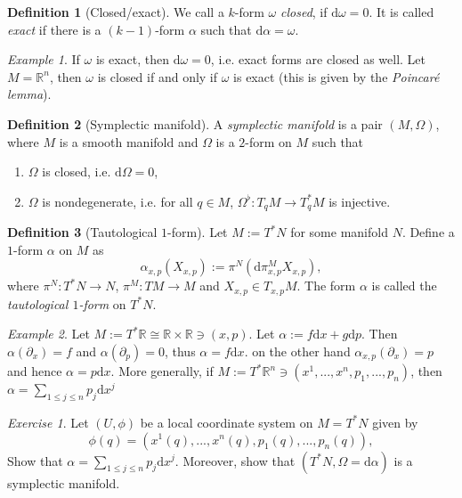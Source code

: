 \documentclass[11pt]{amsart}
\numberwithin{equation}{section}
\theoremstyle{plain}
\theoremstyle{definition}
\newtheorem{defn}{Definition}[subsection]
\theoremstyle{remark}
\newtheorem{exe}{Exercise}[subsection]
\newtheorem{ex}{Example}[subsection]
\newcommand{\R}{\mathbb{R}}
\newcommand{\dd}{{\mathrm{d}}}
\begin{document}
\begin{defn}[Closed/exact]
We call a $k$-form $\omega$ \emph{closed}, if $\dd\omega=0$. It is called \emph{exact} if there is a $(k-1)$-form $\alpha$ such that $\dd\alpha=\omega$.
\end{defn}

\begin{ex}
If $\omega$ is exact, then $\dd\omega=0$, i.e. exact forms are closed as well. Let $M=\R^n$, then $\omega$ is closed if and only if $\omega$ is exact (this is given by the \emph{Poincar\'e lemma}).
\end{ex}


\begin{defn}[Symplectic manifold]
A \emph{symplectic manifold} is a pair $(M,\Omega)$, where $M$ is a smooth manifold and $\Omega$ is a $2$-form on $M$ such that
\begin{enumerate}
\item{$\Omega$ is closed, i.e. $\dd\Omega=0$,}
\item{$\Omega$ is nondegenerate, i.e. for all $q\in M$, $\Omega^\flat\colon T_qM\to T_q^*M$ is injective.}
\end{enumerate}
\end{defn}

\begin{defn}[Tautological $1$-form]
Let $M:=T^*N$ for some manifold $N$. Define a $1$-form $\alpha$ on $M$ as 
$$\alpha_{x,p}(X_{x,p}):=\pi^N(\dd \pi^M_{x,p}X_{x,p}),$$
where $\pi^N\colon T^*N\to N$, $\pi^M\colon TM\to M$ and $X_{x,p}\in T_{x,p}M$. The form $\alpha$ is called the \emph{tautological $1$-form} on $T^*N$.
\end{defn}

\begin{ex}
Let $M:=T^*\R\cong \R\times \R\ni(x,p)$. Let $\alpha:=f\dd x+g\dd p$. Then $\alpha(\partial_x)=f$ and $\alpha(\partial_p)=0$, thus $\alpha=f\dd x$. on the other hand $\alpha_{x,p}(\partial_x)=p$ and hence $\alpha=p\dd x$. More generally, if $M:=T^*\R^n\ni(x^{1},...,x^n,p_1,...,p_n)$, then $\alpha=\sum_{1\leq j\leq n}p_j\dd x^j$
\end{ex}

\begin{exe}
Let $(U,\phi)$ be a local coordinate system on $M=T^*N$ given by $$\phi(q)=(x^1(q),...,x^n(q),p_1(q),...,p_n(q)),$$ Show that $\alpha=\sum_{1\leq j\leq n}p_j\dd x^j$. Moreover, show that $(T^*N,\Omega=\dd\alpha)$ is a symplectic manifold.
\end{exe}
\end{document}
